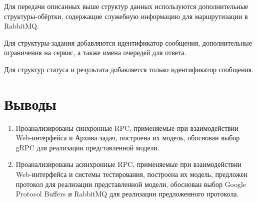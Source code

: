 Для передачи описанных выше структур данных используются дополнительные
структуры-обёртки, содержащие служебную информацию для маршрутизации в RabbitMQ.

Для структуры-задания добавляются идентификатор сообщения, дополнительные
ограничения на сервис, а также имена очередей для ответа.

Для структур статуса и результата добавляется только идентификатор сообщения.



\section{Выводы}
\begin{enumerate}
    \item Проанализированы синхронные RPC, применяемые при взаимодействии
        Web-интерфейса и Архива задач, построена их модель,
        обоснован выбор gRPC для реализации представленной модели.
    \item Проанализированы асинхронные RPC, применяемые при взаимодействии
        Web-интерфейса и системы тестирования, построена их модель,
        предложен протокол для реализации представленной модели,
        обоснован выбор Google Protocol Buffers и RabbitMQ для реализации
        предложенного протокола.
\end{enumerate}
